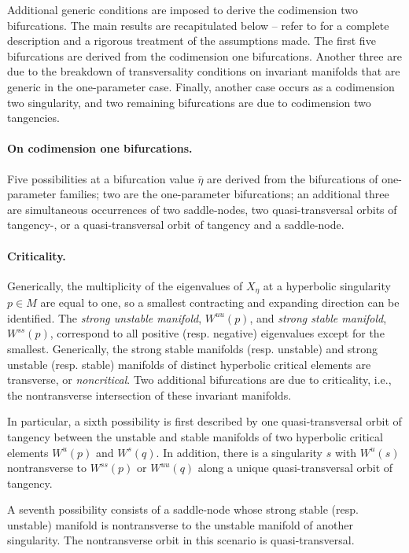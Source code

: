 \documentclass[12pt]{article}
\begin{document}
Additional generic conditions are imposed to derive the codimension two bifurcations. The main results are recapitulated below -- refer to \cite{dias1989bifurcations} for a complete description and a rigorous treatment of the assumptions made. The first five bifurcations are derived from the codimension one bifurcations. Another three are due to the breakdown of transversality conditions on invariant manifolds that are generic in the one-parameter case. Finally, another case occurs as a codimension two singularity, and two remaining bifurcations are due to codimension two tangencies.


\paragraph{On codimension one bifurcations.}
Five possibilities at a bifurcation value $\overline{\eta}$ are derived from the bifurcations of one-parameter families; two are the one-parameter bifurcations; an additional three are simultaneous occurrences of two saddle-nodes, two quasi-transversal orbits of tangency-, or a quasi-transversal orbit of tangency and a saddle-node.


\paragraph{Criticality.}
Generically, the multiplicity of the eigenvalues of $X_{\eta}$ at a hyperbolic singularity $p \in M$ are equal to one, so a smallest contracting and expanding direction can be identified. The \textit{strong unstable manifold}, $W^{uu}(p)$, and \textit{strong stable manifold}, $W^{ss}(p)$, correspond to all positive (resp. negative) eigenvalues except for the smallest. Generically, the strong stable manifolds (resp. unstable) and strong unstable (resp. stable) manifolds of distinct hyperbolic critical elements are transverse, or \textit{noncritical}. Two additional bifurcations are due to criticality, i.e., the nontransverse intersection of these invariant manifolds. 

In particular, a sixth possibility is first described by one quasi-transversal orbit of tangency between the unstable and stable manifolds of two hyperbolic critical elements $W^u(p)$ and $W^s(q)$. In addition, there is a singularity $s$ with $W^u(s)$ nontransverse to $W^{ss}(p)$ or $W^{uu}(q)$ along a unique quasi-transversal orbit of tangency.

A seventh possibility consists of a saddle-node whose strong stable (resp. unstable) manifold is nontransverse to the unstable manifold of another singularity. The nontransverse orbit in this scenario is quasi-transversal.
\end{document}
